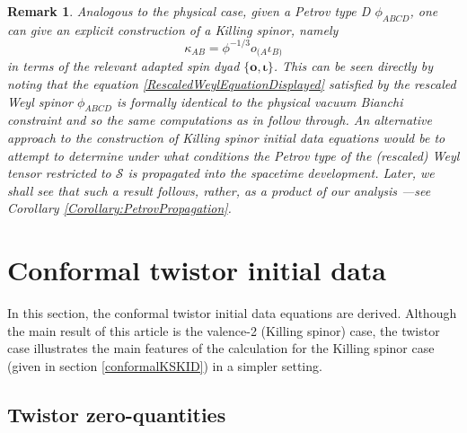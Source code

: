 \documentclass[10pt,a4paper]{article}
\theoremstyle{plain}
\newtheorem{remark}{Remark}
\def\bmo{{\bm o}}
\begin{document}
\begin{remark}{\em 
Analogous to the physical case, given a Petrov type D $\phi_{ABCD}$,
one can give an explicit construction of a Killing spinor, namely
\begin{equation*}
\kappa_{AB} = \phi^{-1/3}o_{(A}\iota_{B)}
\end{equation*}
in terms of the relevant adapted spin dyad $\lbrace \bmo,
\bm\iota\rbrace$. This can be seen directly by noting that the
equation \eqref{RescaledWeylEquationDisplayed} satisfied by the
rescaled Weyl spinor $\phi_{ABCD}$ is formally identical to the
physical vacuum Bianchi constraint and so the same computations as in
\cite{WalkerPenrose70} follow through.  An alternative approach to the
construction of Killing spinor initial data equations would be to
attempt to determine under what conditions the Petrov type of the
(rescaled) Weyl tensor restricted to $\mathcal{S}$ is propagated into
the spacetime development. Later, we shall see that such a result
follows, rather, as a \emph{product} of our analysis ---see Corollary
\ref{Corollary:PetrovPropagation}.}\label{Remark:DyadExpressionForKillingSpinorInTypeD}
\end{remark}

  \section{Conformal twistor initial data}
  \label{conformalTwistorKID}
  In this section, the conformal twistor initial data equations are
  derived. Although the main result of this article is the valence-2 (Killing spinor) case, the twistor case illustrates the main features of the calculation for the Killing spinor case (given in section \ref{conformalKSKID}) in a simpler setting.
\subsection{Twistor zero-quantities}
\label{Sec:TwistorZeroQuantities}
\end{document}

